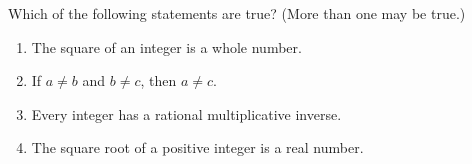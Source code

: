 Which of the following statements are true? (More than one may be true.)
\begin{enumerate}
\item[I.] The square of an integer is a whole number.
\item[II.] If $a\ne b$ and $b\ne c$, then $a\ne c$.
\item[III.] Every integer has a rational multiplicative inverse.
\item[IV.] The square root of a positive integer is a real number.
\end{enumerate}
